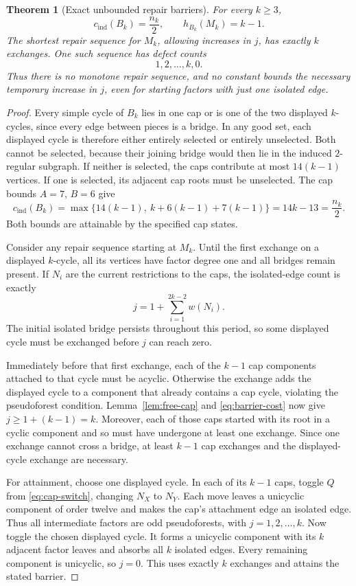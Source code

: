 \documentclass[11pt]{article}
\newtheorem{theorem}{Theorem}[section]
\newcommand{\cind}{c_{\mathrm{ind}}}
\begin{document}
\begin{theorem}[Exact unbounded repair barriers]\label{thm:pseudo-barrier}
For every $k\geq3$,
\[
 \cind(B_k)=\frac{n_k}{2},\qquad h_{B_k}(M_k)=k-1.
\]
The shortest repair sequence for $M_k$, allowing increases in
$j$, has exactly $k$ exchanges. One such sequence has defect counts
\[
 1,2,\ldots,k,0.
\]
Thus there is no monotone repair sequence, and no constant bounds
the necessary temporary increase in $j$, even for starting factors
with just one isolated edge.
\end{theorem}
\begin{proof}
Every simple cycle of $B_k$ lies in one cap or is one of the
two displayed $k$-cycles, since every edge between pieces is a
bridge. In any good set, each displayed cycle is therefore either
entirely selected or entirely unselected. Both cannot be selected,
because their joining bridge would then lie in the induced
$2$-regular subgraph. If neither is selected, the caps contribute
at most $14(k-1)$ vertices. If one is selected, its adjacent cap
roots must be unselected. The cap bounds $A=7$, $B=6$ give
\[
 \cind(B_k)=\max\{14(k-1),\ k+6(k-1)+7(k-1)\}
            =14k-13=\frac{n_k}{2}.
\]
Both bounds are attainable by the specified cap states.

Consider any repair sequence starting at $M_k$. Until the first
exchange on a displayed $k$-cycle, all its vertices have factor
degree one and all bridges remain present. If $N_i$ are the
current restrictions to the caps, the isolated-edge count is
exactly
\begin{equation}\label{eq:barrier-cost}
 j=1+\sum_{i=1}^{2k-2} w(N_i).
\end{equation}
The initial isolated bridge persists throughout this period, so
some displayed cycle must be exchanged before $j$ can reach zero.

Immediately before that first exchange, each of the $k-1$ cap
components attached to that cycle must be acyclic. Otherwise
the exchange adds the displayed cycle to a component that already
contains a cap cycle, violating the pseudoforest condition.
Lemma~\ref{lem:free-cap} and \eqref{eq:barrier-cost} now give
$j\geq1+(k-1)=k$. Moreover, each of those caps started with its
root in a cyclic component and so must have undergone at least
one exchange. Since one exchange cannot cross a bridge, at least
$k-1$ cap exchanges and the displayed-cycle exchange are necessary.

For attainment, choose one displayed cycle. In each of its
$k-1$ caps, toggle $Q$ from \eqref{eq:cap-switch}, changing
$N_X$ to $N_Y$. Each move leaves a unicyclic component of order
twelve and makes the cap's attachment edge an isolated edge.
Thus all intermediate factors are odd pseudoforests, with
$j=1,2,\ldots,k$. Now toggle the chosen displayed cycle.
It forms a unicyclic component with its $k$ adjacent factor
leaves and absorbs all $k$ isolated edges. Every remaining
component is unicyclic, so $j=0$. This uses exactly $k$ exchanges
and attains the stated barrier.
\end{proof}
\end{document}
